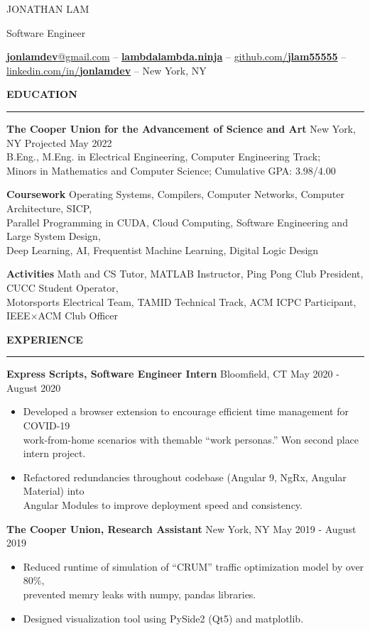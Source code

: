 \documentclass[]{article}
\newcommand{\br}{\vspace{12pt}}
\newcommand{\brs}{\vspace{3pt}}
\newcommand{\hr}{\brs\hrule\brs}
\begin{document}
{\LARGE JONATHAN LAM}

Software Engineer

\href{mailto:jonlamdev@gmail.com}{\textbf{jonlamdev}@gmail.com} --
\href{https://lambdalambda.ninja}{\textbf{lambdalambda.ninja}} --
\href{https://github.com/jlam55555}{github.com/\textbf{jlam55555}} --
\href{https://linkedin.com/in/jonlamdev}{linkedin.com/in/\textbf{jonlamdev}} --
New York, NY

\br
\textbf{EDUCATION}
\hr
\textbf{The Cooper Union for the Advancement of Science and Art}
New York, NY
\hfill
Projected May 2022\\
B.Eng., M.Eng. in Electrical Engineering, Computer Engineering Track;\\
Minors in Mathematics and Computer Science; Cumulative GPA: 3.98/4.00

\brs

\textbf{Coursework} Operating Systems, Compilers, Computer Networks, Computer Architecture, SICP, \\
Parallel Programming in CUDA, Cloud Computing, Software Engineering and Large System Design,\\
Deep Learning, AI, Frequentist Machine Learning, Digital Logic Design

\brs

\textbf{Activities} Math and CS Tutor, MATLAB Instructor, Ping Pong Club President, CUCC Student Operator,\\
Motorsports Electrical Team, TAMID Technical Track, ACM ICPC Participant, IEEE$\times$ACM Club Officer

\br

\textbf{EXPERIENCE}
\hr
\textbf{Express Scripts, Software Engineer Intern}
Bloomfield, CT
\hfill
May 2020 - August 2020
\begin{itemize}
\item Developed a browser extension to encourage efficient time management for COVID-19\\
  work-from-home scenarios with themable ``work personas.'' Won second place intern project.
\item Refactored redundancies throughout codebase (Angular 9, NgRx, Angular Material) into\\
  Angular Modules to improve deployment speed and consistency.
\end{itemize}

\brs

\textbf{The Cooper Union, Research Assistant}
New York, NY
\hfill
May 2019 - August 2019
\begin{itemize}
\item Reduced runtime of simulation of ``CRUM'' traffic optimization model by over 80\%,\\
  prevented memry leaks with numpy, pandas libraries.
\item Designed visualization tool using PySide2 (Qt5) and matplotlib.
\end{itemize}


\end{document}
